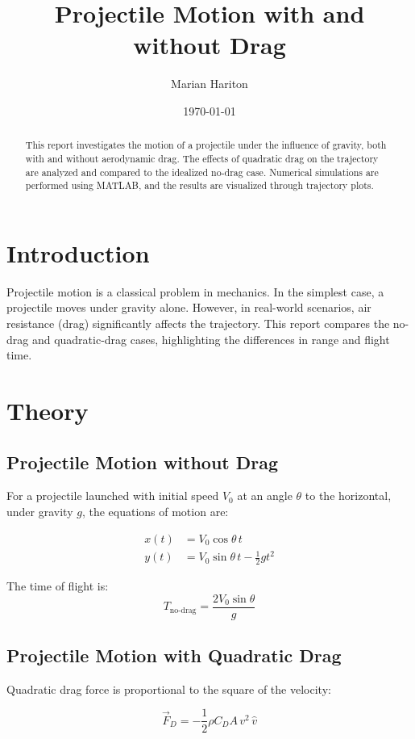 \documentclass[12pt,a4paper]{article}
\title{Projectile Motion with and without Drag}
\author{Marian Hariton}
\date{\today}
\begin{document}
\maketitle

\begin{abstract}
This report investigates the motion of a projectile under the influence of gravity, both with and without aerodynamic drag. The effects of quadratic drag on the trajectory are analyzed and compared to the idealized no-drag case. Numerical simulations are performed using MATLAB, and the results are visualized through trajectory plots.
\end{abstract}

\section{Introduction}
Projectile motion is a classical problem in mechanics. In the simplest case, a projectile moves under gravity alone. However, in real-world scenarios, air resistance (drag) significantly affects the trajectory. This report compares the no-drag and quadratic-drag cases, highlighting the differences in range and flight time.

\section{Theory}
\subsection{Projectile Motion without Drag}
For a projectile launched with initial speed $V_0$ at an angle $\theta$ to the horizontal, under gravity $g$, the equations of motion are:

\begin{align}
x(t) &= V_0 \cos\theta \, t \\
y(t) &= V_0 \sin\theta \, t - \frac{1}{2} g t^2
\end{align}

The time of flight is:
\[
T_\text{no-drag} = \frac{2 V_0 \sin\theta}{g}
\]

\subsection{Projectile Motion with Quadratic Drag}
Quadratic drag force is proportional to the square of the velocity:

\[
\vec{F}_D = -\frac{1}{2} \rho C_D A \, v^2 \, \hat{v}
\]
\end{document}

